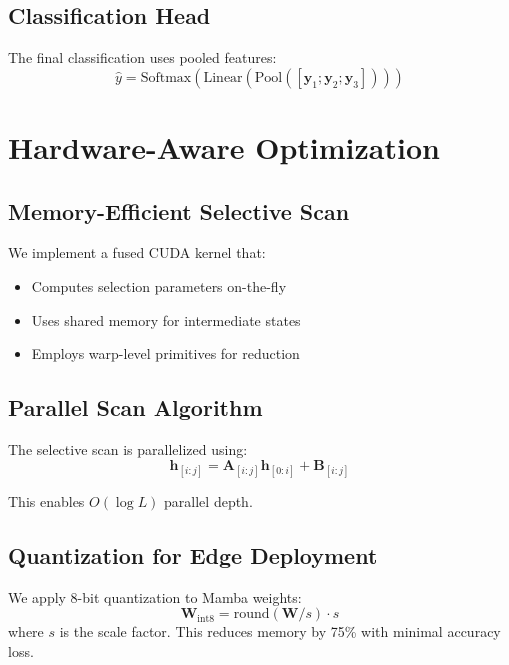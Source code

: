 \documentclass[10pt,conference]{IEEEtran}
\begin{document}
\subsection{Classification Head}

The final classification uses pooled features:
\begin{equation}
    \hat{y} = \text{Softmax}(\text{Linear}(\text{Pool}([\mathbf{y}_1; \mathbf{y}_2; \mathbf{y}_3])))
\end{equation}

\section{Hardware-Aware Optimization}
\label{sec:optimization}

\subsection{Memory-Efficient Selective Scan}

We implement a fused CUDA kernel that:
\begin{itemize}
    \item Computes selection parameters on-the-fly
    \item Uses shared memory for intermediate states
    \item Employs warp-level primitives for reduction
\end{itemize}

\subsection{Parallel Scan Algorithm}

The selective scan is parallelized using:
\begin{equation}
    \mathbf{h}_{[i:j]} = \mathbf{A}_{[i:j]} \mathbf{h}_{[0:i]} + \mathbf{B}_{[i:j]}
\end{equation}

This enables $O(\log L)$ parallel depth.

\subsection{Quantization for Edge Deployment}

We apply 8-bit quantization to Mamba weights:
\begin{equation}
    \mathbf{W}_{\text{int8}} = \text{round}(\mathbf{W} / s) \cdot s
\end{equation}
where $s$ is the scale factor. This reduces memory by 75\% with minimal accuracy loss.
\end{document}
